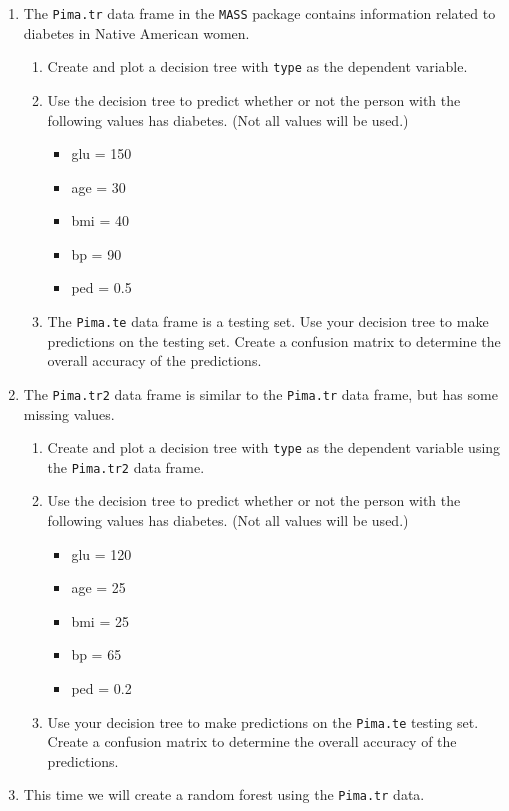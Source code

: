 \documentclass[
]{book}
\providecommand{\tightlist}{%
  \setlength{\itemsep}{0pt}\setlength{\parskip}{0pt}}
\theoremstyle{definition}
\theoremstyle{definition}
\theoremstyle{definition}
\theoremstyle{definition}
\theoremstyle{remark}
\begin{document}
\begin{enumerate}
\def\labelenumi{\arabic{enumi}.}
\setcounter{enumi}{8}
\item
  The \texttt{Pima.tr} data frame in the \texttt{MASS} package contains information related to diabetes in Native American women.

  \begin{enumerate}
  \def\labelenumii{\alph{enumii}.}
  \tightlist
  \item
    Create and plot a decision tree with \texttt{type} as the dependent variable.
  \item
    Use the decision tree to predict whether or not the person with the following values has diabetes. (Not all values will be used.)

    \begin{itemize}
    \tightlist
    \item
      glu = 150
    \item
      age = 30
    \item
      bmi = 40
    \item
      bp = 90
    \item
      ped = 0.5
    \end{itemize}
  \item
    The \texttt{Pima.te} data frame is a testing set. Use your decision tree to make predictions on the testing set. Create a confusion matrix to determine the overall accuracy of the predictions.
  \end{enumerate}
\item
  The \texttt{Pima.tr2} data frame is similar to the \texttt{Pima.tr} data frame, but has some missing values.

  \begin{enumerate}
  \def\labelenumii{\alph{enumii}.}
  \tightlist
  \item
    Create and plot a decision tree with \texttt{type} as the dependent variable using the \texttt{Pima.tr2} data frame.
  \item
    Use the decision tree to predict whether or not the person with the following values has diabetes. (Not all values will be used.)

    \begin{itemize}
    \tightlist
    \item
      glu = 120
    \item
      age = 25
    \item
      bmi = 25
    \item
      bp = 65
    \item
      ped = 0.2
    \end{itemize}
  \item
    Use your decision tree to make predictions on the \texttt{Pima.te} testing set. Create a confusion matrix to determine the overall accuracy of the predictions.
  \end{enumerate}
\item
  This time we will create a random forest using the \texttt{Pima.tr} data.


\end{enumerate}
\end{document}
